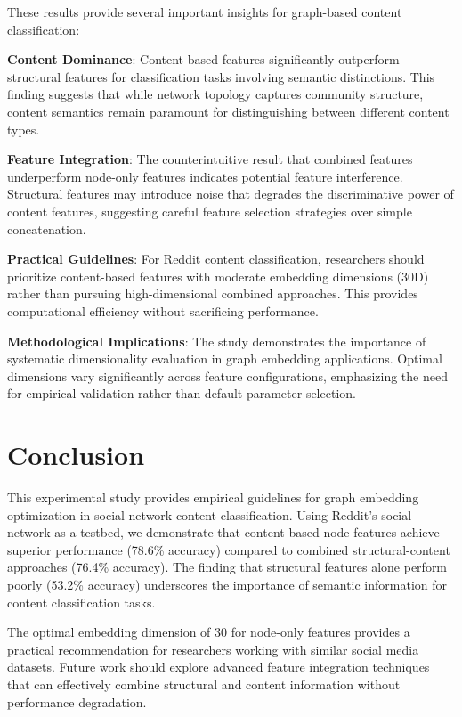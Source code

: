 \documentclass[linenumbers]{aastex701}
\begin{document}
These results provide several important insights for graph-based content classification:

\textbf{Content Dominance}: Content-based features significantly outperform structural features for classification tasks involving semantic distinctions. This finding suggests that while network topology captures community structure, content semantics remain paramount for distinguishing between different content types.

\textbf{Feature Integration}: The counterintuitive result that combined features underperform node-only features indicates potential feature interference. Structural features may introduce noise that degrades the discriminative power of content features, suggesting careful feature selection strategies over simple concatenation.

\textbf{Practical Guidelines}: For Reddit content classification, researchers should prioritize content-based features with moderate embedding dimensions (30D) rather than pursuing high-dimensional combined approaches. This provides computational efficiency without sacrificing performance.

\textbf{Methodological Implications}: The study demonstrates the importance of systematic dimensionality evaluation in graph embedding applications. Optimal dimensions vary significantly across feature configurations, emphasizing the need for empirical validation rather than default parameter selection.

\section{Conclusion} \label{sec:conclusion}

This experimental study provides empirical guidelines for graph embedding optimization in social network content classification. Using Reddit's social network as a testbed, we demonstrate that content-based node features achieve superior performance (78.6\% accuracy) compared to combined structural-content approaches (76.4\% accuracy). The finding that structural features alone perform poorly (53.2\% accuracy) underscores the importance of semantic information for content classification tasks.

The optimal embedding dimension of 30 for node-only features provides a practical recommendation for researchers working with similar social media datasets. Future work should explore advanced feature integration techniques that can effectively combine structural and content information without performance degradation.
\end{document}
